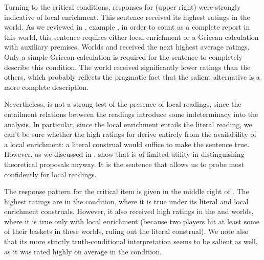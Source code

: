 \documentclass[leqno,12pt]{article}
\begin{document}
Turning to the critical conditions, responses for 
 (upper right) were
strongly indicative of local enrichment. This sentence received its
highest ratings in the  world. As we reviewed in
, example , in order to
count as a complete report in this world, this sentence requires
either local enrichment or a Gricean calculation with auxiliary
premises. Worlds  and  received the next highest
average ratings. Only a simple Gricean calculation is required for the
sentence to completely describe this condition. The
 world received significantly lower ratings than the
others, which probably reflects the pragmatic fact that the salient
alternative  is a more
complete description.

Nevertheless,  is not a strong test of the
presence of local readings, since the entailment relations between the readings
introduce some indeterminacy into the analysis. In particular, since
the local enrichment entails the literal reading, we can't be sure
whether the high ratings for  derive entirely from the
availability of a local enrichment: a literal construal would
suffice to make the sentence true. However, as we discussed in
, \citeauthor{Chemla:Spector:2011} show that
 is of limited utility in distinguishing
theoretical proposals anyway. It is the 
sentence that allows us to probe most confidently for local
readings. 

The response pattern for the critical item  is given in the
middle right of . The highest ratings are in
the  condition, where it is true under its literal and
local enrichment construals. However, it also received high ratings in
the  and  worlds, where it is true only with
local enrichment (because two players hit at least some of their
baskets in these worlds, ruling out the literal construal).  We note
also that its more strictly truth-conditional interpretation seems to
be salient as well, as it was rated highly on average in the
 condition.
\end{document}
